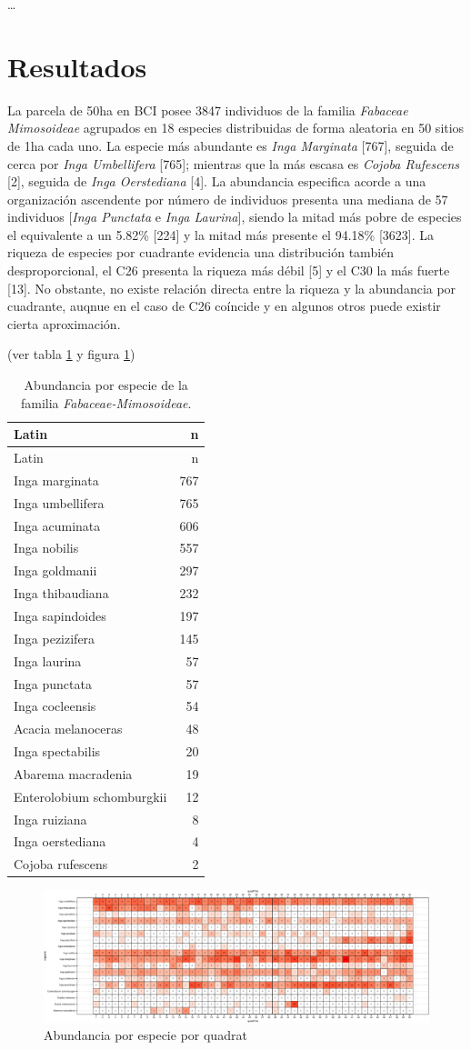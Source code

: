\documentclass[11pt,]{article}
\begin{document}
\ldots

\section{Resultados}\label{resultados}

La parcela de 50ha en BCI posee 3847 individuos de la familia
\emph{Fabaceae Mimosoideae} agrupados en 18 especies distribuidas de
forma aleatoria en 50 sitios de 1ha cada uno. La especie más abundante
es \emph{Inga Marginata} {[}767{]}, seguida de cerca por \emph{Inga
Umbellifera} {[}765{]}; mientras que la más escasa es \emph{Cojoba
Rufescens} {[}2{]}, seguida de \emph{Inga Oerstediana} {[}4{]}. La
abundancia especifica acorde a una organización ascendente por número de
individuos presenta una mediana de 57 individuos {[}\emph{Inga Punctata}
e \emph{Inga Laurina}{]}, siendo la mitad más pobre de especies el
equivalente a un 5.82\% {[}224{]} y la mitad más presente el 94.18\%
{[}3623{]}. La riqueza de especies por cuadrante evidencia una
distribución también desproporcional, el C26 presenta la riqueza más
débil {[}5{]} y el C30 la más fuerte {[}13{]}. No obstante, no existe
relación directa entre la riqueza y la abundancia por cuadrante, auqnue
en el caso de C26 coíncide y en algunos otros puede existir cierta
aproximación.

(ver tabla \ref{tab:abun_sp} y figura \ref{fig:abun_sp_q})

\begin{longtable}[]{@{}lr@{}}
\caption{\label{tab:abun_sp}Abundancia por especie de la familia
\emph{Fabaceae-Mimosoideae}.}\tabularnewline
\toprule
Latin & n\tabularnewline
\midrule
\endfirsthead
\toprule
Latin & n\tabularnewline
\midrule
\endhead
Inga marginata & 767\tabularnewline
Inga umbellifera & 765\tabularnewline
Inga acuminata & 606\tabularnewline
Inga nobilis & 557\tabularnewline
Inga goldmanii & 297\tabularnewline
Inga thibaudiana & 232\tabularnewline
Inga sapindoides & 197\tabularnewline
Inga pezizifera & 145\tabularnewline
Inga laurina & 57\tabularnewline
Inga punctata & 57\tabularnewline
Inga cocleensis & 54\tabularnewline
Acacia melanoceras & 48\tabularnewline
Inga spectabilis & 20\tabularnewline
Abarema macradenia & 19\tabularnewline
Enterolobium schomburgkii & 12\tabularnewline
Inga ruiziana & 8\tabularnewline
Inga oerstediana & 4\tabularnewline
Cojoba rufescens & 2\tabularnewline
\bottomrule
\end{longtable}

\begin{figure}
\centering
\includegraphics{manuscrito_files/figure-latex/unnamed-chunk-3-1.pdf}
\caption{\label{fig:abun_sp_q}Abundancia por especie por quadrat}
\end{figure}
\end{document}
